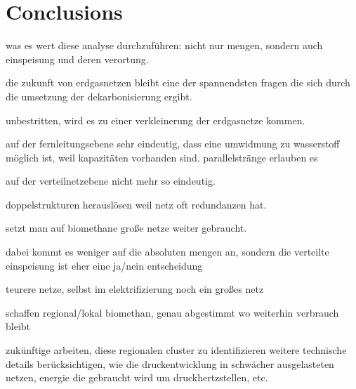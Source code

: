 \section{Conclusions}\label{conclusions}
was es wert diese analyse durchzuführen: nicht nur mengen, sondern auch einspeisung und deren verortung.


die zukunft von erdgasnetzen bleibt eine der spannendsten fragen die sich durch die umsetzung der dekarbonisierung ergibt. 

unbestritten, wird es zu einer verkleinerung der erdgasnetze kommen.

auf der fernleitungsebene sehr eindeutig, dass eine umwidmung zu wasserstoff möglich ist, weil kapazitäten vorhanden sind. parallelstränge erlauben es

auf der verteilnetzebene nicht mehr so eindeutig. 

doppelstrukturen herauslösen weil netz oft redundanzen hat.

setzt man auf biomethane große netze weiter gebraucht.

dabei kommt es weniger auf die absoluten mengen an, sondern die verteilte einspeisung ist eher eine ja/nein entscheidung

teurere netze, selbst im elektrifizierung noch ein großes netz 

schaffen regional/lokal biomethan, genau abgestimmt wo weiterhin verbrauch bleibt

zukünftige arbeiten, diese regionalen cluster zu identifizieren
weitere technische details berücksichtigen, wie die druckentwicklung in schwächer ausgelasteten netzen, energie die gebraucht wird um druckhertzstellen, etc.
